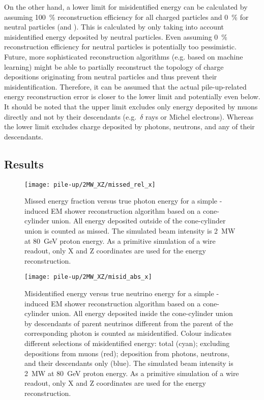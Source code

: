 On the other hand, a lower limit for misidentified energy can be calculated by assuming \SI{100}{\percent} reconstruction efficiency for all charged particles and \SI{0}{\percent} for neutral particles (\Pgpz and \Pgg).
This is calculated by only taking into account misidentified energy deposited by neutral particles.
Even assuming \SI{0}{\percent} reconstruction efficiency for neutral particles is potentially too pessimistic.
Future, more sophisticated reconstruction algorithms (e.g. based on machine learning) might be able to partially reconstruct the topology of charge depositions originating from neutral particles and thus prevent their misidentification.
Therefore, it can be assumed that the actual pile-up-related energy reconstruction error is closer to the lower limit and potentially even below.
It should be noted that the upper limit excludes only energy deposited by muons directly and not by their descendants (e.g.\ $\delta$ rays or Michel electrons).
Whereas the lower limit excludes charge deposited by photons, neutrons, and any of their descendants.

\subsection{Results}
\label{sec:dune-nd_pile-up_results}

\begin{figure}[htb]
	\centering
	\texttt{[image: pile-up/2MW\_XZ/missed\_rel\_x]}
	\caption{Missed energy fraction versus true photon energy for a simple \Pgpz-induced EM shower reconstruction algorithm based on a cone-cylinder union.
		All energy deposited outside of the cone-cylinder union is counted as missed.
		The simulated beam intensity is \SI{2}{\mega\watt} at \SI{80}{\giga\electronvolt} proton energy.
		As a primitive simulation of a wire readout, only X and Z coordinates are used for the energy reconstruction.}
	\label{fig:dune-nd_2MW-XZ_missed-rel-x}
\end{figure}

\begin{figure}[htb]
	\centering
	\texttt{[image: pile-up/2MW\_XZ/misid\_abs\_x]}
	\caption{Misidentified energy versus true neutrino energy for a simple \Pgpz-induced EM shower reconstruction algorithm based on a cone-cylinder union.
		All energy deposited inside the cone-cylinder union by descendants of parent neutrinos different from the parent of the corresponding \Pgpz photon is counted as misidentified.
		Colour indicates different selections of misidentified energy: total (cyan); excluding depositions from muons (red); deposition from photons, neutrons, and their descendants only (blue).
		The simulated beam intensity is \SI{2}{\mega\watt} at \SI{80}{\giga\electronvolt} proton energy.
		As a primitive simulation of a wire readout, only X and Z coordinates are used for the energy reconstruction.}
	\label{fig:dune-nd_2MW-XZ_misid-abs-x}
\end{figure}


